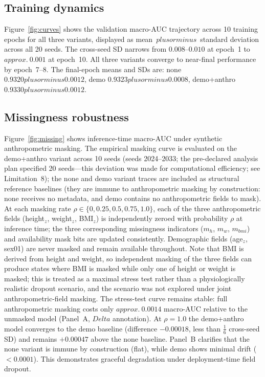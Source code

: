 \documentclass[mathematics,article,submit,pdftex]{Definitions/mdpi}
\def\texttt#1{#1}%
\def\mathrm#1{#1}%
\def\textbf#1{#1}%
\def\Delta{Delta }%
\def\pm{plus or minus }%
\def\approx{approx.\ }%
\begin{document}
\subsection{Training dynamics}
Figure~\ref{fig:curves} shows the validation macro-AUC trajectory across 10 training epochs for all three variants, displayed as mean~$\pm$~standard deviation across all 20 seeds. The cross-seed SD narrows from $0.008$--$0.010$ at epoch~1 to ${\approx}0.001$ at epoch~10. All three variants converge to near-final performance by epoch~7--8. The final-epoch means and SDs are: \texttt{none} $0.9320\pm0.0012$, \texttt{demo} $0.9323\pm0.0008$, \texttt{demo+anthro} $0.9330\pm0.0012$.

\subsection{Missingness robustness}
Figure~\ref{fig:missing} shows inference-time macro-AUC under synthetic anthropometric masking. The empirical masking curve is evaluated on the \texttt{demo+anthro} variant across \textbf{10 seeds} (seeds 2024--2033; the pre-declared analysis plan specified 20 seeds---this deviation was made for computational efficiency; see Limitation~8); the \texttt{none} and \texttt{demo} variant traces are included as structural reference baselines (they are immune to anthropometric masking by construction: \texttt{none} receives no metadata, and \texttt{demo} contains no anthropometric fields to mask). At each masking rate $\rho \in \{0, 0.25, 0.5, 0.75, 1.0\}$, each of the three anthropometric fields (height$_z$, weight$_z$, BMI$_z$) is independently zeroed with probability $\rho$ at inference time; the three corresponding missingness indicators ($m_h$, $m_w$, $m_{\mathrm{bmi}}$) and availability mask bits are updated consistently. Demographic fields (age$_z$, sex01) are never masked and remain available throughout. Note that BMI is derived from height and weight, so independent masking of the three fields can produce states where BMI is masked while only one of height or weight is masked; this is treated as a maximal stress test rather than a physiologically realistic dropout scenario, and the scenario was not explored under joint anthropometric-field masking. The stress-test curve remains stable: full anthropometric masking costs only $\approx 0.0014$ macro-AUC relative to the unmasked model (Panel~A, $\Delta$ annotation). At $\rho{=}1.0$ the \texttt{demo+anthro} model converges to the \texttt{demo} baseline (difference $-0.00018$, less than $\frac{1}{6}$ cross-seed SD) and remains $+0.00047$ above the \texttt{none} baseline. Panel~B clarifies that the \texttt{none} variant is immune by construction (flat), while \texttt{demo} shows minimal drift ($<0.0001$). This demonstrates graceful degradation under deployment-time field dropout.
\end{document}

